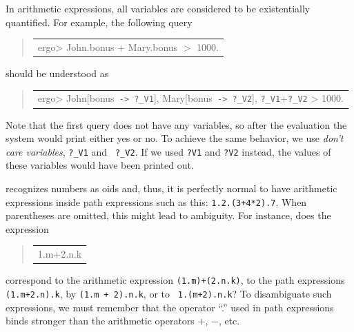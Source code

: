 \documentclass[11pt]{article}
\newcommand{\ERGO}{\mbox{\smaller{\ensuremath{\cal{E}}\smaller{{\sc{RGO}}}}}\xspace}
\newcommand{\FLSYSTEM}{\ERGO}
\newcommand{\prompt}{ergo> }
\newenvironment{qrules}{\begin{quote}\tt\begin{tabular}[t]{l}}%
{\end{tabular}\end{quote}}
\newcommand{\mvd}{{\mbox{\tt \,->\,}}}  %
\begin{document}
In arithmetic expressions, all variables are considered to be
existentially quantified. For example, the following query
\begin{qrules}
\prompt John.bonus $+$ Mary.bonus $>$ 1000.
\end{qrules}
should be understood as
\begin{qrules}
\prompt John[bonus{\mvd}{\tt ?\_V1}], Mary[bonus{\mvd}{\tt ?\_V2}], {\tt ?\_V1}+{\tt ?\_V2} > 1000.
\end{qrules}
Note that the first query does not have any variables, so after the
evaluation the system would print either yes or no. To achieve the same
behavior, we use \emph{don't care variables}, {\tt ?\_V1} and {\tt
  ?\_V2}. If we used {\tt ?V1} and {\tt ?V2} instead, the values of these
variables would have been printed out.

\FLSYSTEM recognizes numbers as oids and, thus, it is perfectly normal to have
arithmetic expressions inside path expressions such as this:
{\tt 1.2.(3+4*2).7}. When parentheses are omitted, this might lead to
ambiguity.
For instance, does the expression
\begin{qrules}
1.m+2.n.k
\end{qrules}
correspond to
the arithmetic expression {\tt (1.m)+(2.n.k)}, to
the path expressions {\tt (1.m+2.n).k}, by {\tt (1.m + 2).n.k}, or to {\tt
  1.(m+2).n.k}? To disambiguate such expressions, we must remember that the
operator ``.'' used in path expressions binds stronger than the
arithmetic operators $+$, $-$, etc.
\end{document}
